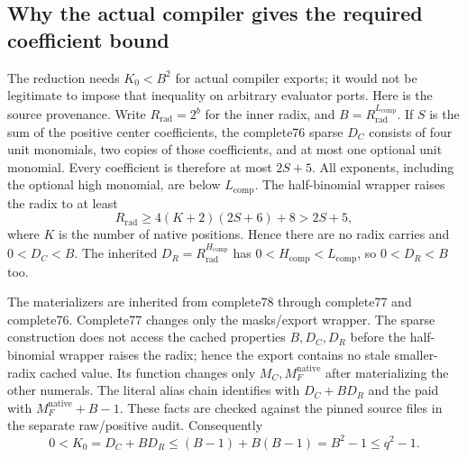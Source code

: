 \documentclass[11pt,letterpaper]{article}
\theoremstyle{definition}\newtheorem{definition}[theorem]{Definition}
\theoremstyle{remark}\newtheorem{remark}[theorem]{Remark}
\newcommand{\code}[1]{\texttt{\detokenize{#1}}}
\newcommand{\MFnat}{M_{F}^{\mathrm{native}}}
\newcommand{\MC}{M_C}
\begin{document}
\subsection{Why the actual compiler gives the required coefficient bound}
The reduction needs $K_0<B^2$ for actual compiler exports; it would not be legitimate to impose that inequality on arbitrary evaluator ports. Here is the source provenance. Write $R_{\mathrm{rad}}=2^b$ for the inner radix, and $B=R_{\mathrm{rad}}^{L_{\mathrm{comp}}}$. If $S$ is the sum of the positive center coefficients, the complete76 sparse $D_C$ consists of four unit monomials, two copies of those coefficients, and at most one optional unit monomial. Every coefficient is therefore at most $2S+5$. All exponents, including the optional high monomial, are below $L_{\mathrm{comp}}$. The half-binomial wrapper raises the radix to at least
\[
 R_{\mathrm{rad}}\ge4(K+2)(2S+6)+8>2S+5,
\]
where $K$ is the number of native positions. Hence there are no radix carries and $0<D_C<B$. The inherited $D_R=R_{\mathrm{rad}}^{H_{\mathrm{comp}}}$ has $0<H_{\mathrm{comp}}<L_{\mathrm{comp}}$, so $0<D_R<B$ too.

The materializers are inherited from complete78 through complete77 and complete76. Complete77 changes only the masks/export wrapper. The sparse construction does not access the cached properties $B,D_C,D_R$ before the half-binomial wrapper raises the radix; hence the export contains no stale smaller-radix cached value. Its \code{new_constants} function changes only $\MC,\MFnat$ after materializing the other numerals. The literal alias chain identifies \code{Kconstant} with $D_C+BD_R$ and the paid \code{MF} with $\MFnat+B-1$. These facts are checked against the pinned source files in the separate raw/positive audit. Consequently
\begin{equation}\label{fup:ir:eq:Kbound}
 0<K_0=D_C+BD_R\le(B-1)+B(B-1)=B^2-1\le q^2-1.
\end{equation}
\end{document}
